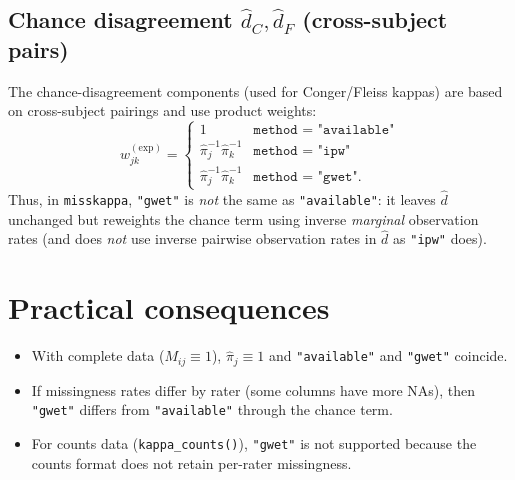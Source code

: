 \documentclass[11pt]{article}
\begin{document}
\subsection*{Chance disagreement $\hat d_C, \hat d_F$ (cross-subject pairs)}

The chance-disagreement components (used for Conger/Fleiss kappas) are based on
cross-subject pairings and use product weights:
\[
  w^{(\mathrm{exp})}_{jk} =
  \begin{cases}
    1 & \texttt{method = "available"} \\
    \hat\pi_j^{-1}\hat\pi_k^{-1} & \texttt{method = "ipw"} \\
    \hat\pi_j^{-1}\hat\pi_k^{-1} & \texttt{method = "gwet"}.
  \end{cases}
\]
Thus, in \texttt{misskappa}, \texttt{"gwet"} is \emph{not} the same as
\texttt{"available"}: it leaves $\hat d$ unchanged but reweights the chance term
using inverse \emph{marginal} observation rates (and does \emph{not} use inverse
pairwise observation rates in $\hat d$ as \texttt{"ipw"} does).

\section*{Practical consequences}

\begin{itemize}
\item With complete data ($M_{ij}\equiv 1$), $\hat\pi_j \equiv 1$ and
  \texttt{"available"} and \texttt{"gwet"} coincide.
\item If missingness rates differ by rater (some columns have more NAs), then
  \texttt{"gwet"} differs from \texttt{"available"} through the chance term.
\item For counts data (\texttt{kappa\_counts()}), \texttt{"gwet"} is not
  supported because the counts format does not retain per-rater missingness.
\end{itemize}
\end{document}
